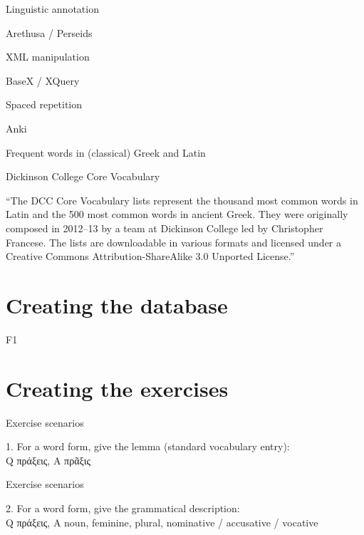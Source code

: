 \documentclass{beamer}
\begin{document}
\begin{frame}{Linguistic annotation}

Arethusa / Perseids

\end{frame}

\begin{frame}{XML manipulation}

BaseX / XQuery

\end{frame}

\begin{frame}{Spaced repetition}

Anki

\end{frame}

\begin{frame}{Frequent words in (classical) Greek and Latin}

\alert{Dickinson College Core Vocabulary}

``The DCC Core Vocabulary lists represent the thousand most common words in Latin and the 500 most common words in ancient Greek. They were originally composed in 2012–13 by a team at Dickinson College led by \alert{Christopher Francese}. The lists are downloadable in various formats and licensed under a Creative Commons Attribution-ShareAlike 3.0 Unported License.''

\end{frame}

\section{Creating the database}

\begin{frame}{F1}


\end{frame}

\section{Creating the exercises}

\begin{frame}{Exercise scenarios}

1. For a word form, give the lemma (standard vocabulary entry):\\
Q πράξεις, A πρᾶξις

\end{frame}

\begin{frame}{Exercise scenarios}


2. For a word form, give the grammatical description:\\
Q πράξεις, A noun, feminine, plural, nominative / accusative / vocative

\end{frame}
\end{document}
